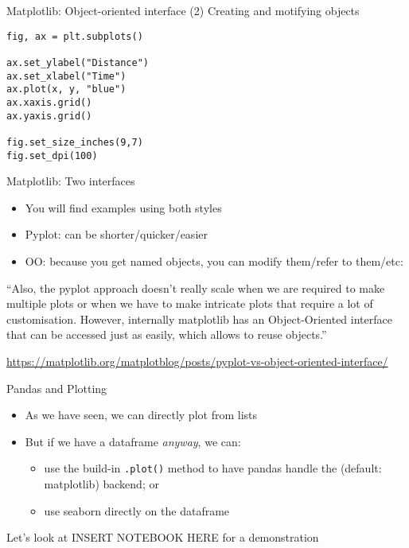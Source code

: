 \begin{frame}[fragile]{Matplotlib: Object-oriented interface}
(2) Creating and motifying objects
\begin{verbatim}
fig, ax = plt.subplots()

ax.set_ylabel("Distance")
ax.set_xlabel("Time")
ax.plot(x, y, "blue")
ax.xaxis.grid()
ax.yaxis.grid()

fig.set_size_inches(9,7)
fig.set_dpi(100)
\end{verbatim}

\end{frame}



\begin{frame}{Matplotlib: Two interfaces}
  \begin{itemize}
  \item You will find examples using both styles
  \item Pyplot: can be shorter/quicker/easier
  \item OO: because you get named objects, you can modify them/refer to them/etc:
  \end{itemize}

  \pause

  ``Also, the pyplot approach doesn't really scale when we are required to make multiple plots or when we have to make intricate plots that require a lot of customisation. However, internally matplotlib has an Object-Oriented interface that can be accessed just as easily, which allows to reuse objects.''

  \tiny \url{https://matplotlib.org/matplotblog/posts/pyplot-vs-object-oriented-interface/}
  
\end{frame}


\begin{frame}{Pandas and Plotting}
  \begin{itemize}
  \item As we have seen, we can directly plot from lists
  \item But if we have a dataframe \emph{anyway}, we can:
    \begin{itemize}
    \item use the build-in \texttt{.plot()} method to have pandas handle the (default: matplotlib) backend; or
    \item use seaborn directly on the dataframe
    \end{itemize}
  \end{itemize}
\end{frame}

\begin{frame}[standout]
Let's look at INSERT NOTEBOOK HERE for a demonstration
\end{frame}
